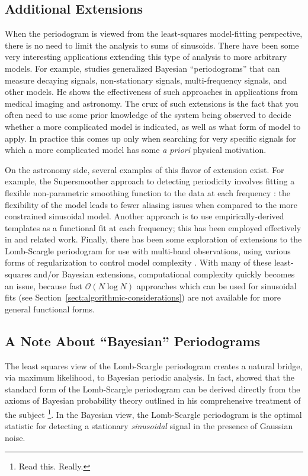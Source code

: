 \documentclass[preprint]{aastex}
\newcommand{\Sect}[1]{Section~\ref{sect:#1}}
\newcommand{\sect}[1]{\Sect{#1}}
\newcommand{\sectlabel}[1]{\label{sect:#1}}
\begin{document}
\subsection{Additional Extensions}
When the periodogram is viewed from the least-squares model-fitting perspective,
there is no need to limit the analysis to sums of sinusoids.
There have been some very interesting applications extending this type of
analysis to more arbitrary models.
For example, \citet{Bretthorst88} studies generalized 
Bayesian ``periodograms'' that can measure
decaying signals, non-stationary signals, multi-frequency signals, and other models.
He shows the effectiveness of such approaches in applications from
medical imaging and astronomy.
The crux of such extensions is the fact that you often need to use some prior
knowledge of the system being observed to decide whether a more complicated
model is indicated, as well as what form of model to apply.
In practice this comes up only when searching for very specific signals for
which a more complicated model has some {\it a priori} physical motivation.

On the astronomy side, several examples of this flavor of extension exist.
For example, the Supersmoother approach to detecting periodicity
involves fitting a flexible non-parametric smoothing
function to the data at each frequency \citep{Reimann94}: the flexibility
of the model leads to fewer aliasing issues when compared to the more
constrained sinusoidal model.
Another approach is to use empirically-derived templates as a functional fit
at each frequency; this has been employed effectively in \citet{Sesar2010,
Sesar2013} and related work.
Finally, there has been some exploration of extensions to the Lomb-Scargle
periodogram for use with multi-band observations, using various forms of
regularization to control model complexity \citep{VanderPlas2015, Long2016}.
With many of these least-squares and/or Bayesian extensions,
computational complexity quickly becomes an issue, because fast
$\mathcal{O}(N\log N)$ approaches which can be used for sinusoidal fits
(see \sect{algorithmic-considerations}) are not available for more general
functional forms.

\subsection{A Note About ``Bayesian'' Periodograms}
\sectlabel{bayesian-periodograms}
The least squares view of the Lomb-Scargle periodogram creates a natural
bridge, via maximum likelihood, to Bayesian periodic analysis.
In fact, \citet{Jaynes87} showed that the standard form of the Lomb-Scargle
periodogram can be derived directly from the axioms of Bayesian probability
theory outlined in his comprehensive treatment of the subject
\citep{Jaynes03}\footnote{Read this. Really.}.
In the Bayesian view, the Lomb-Scargle periodogram is the optimal statistic
for detecting a stationary {\it sinusoidal} signal in the presence of Gaussian
noise.
\end{document}
